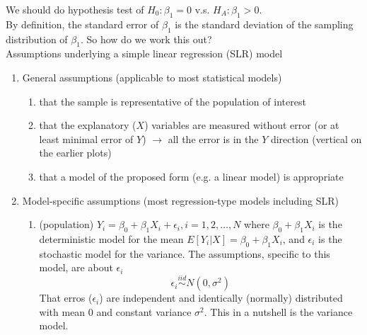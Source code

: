 \documentclass[a4paper, 11pt, twoside]{article}
\begin{document}
We should do hypothesis test of $H_0: \beta_1=0$ v.s. $H_A:\beta_1 > 0$. \\

By definition, the standard error of $\beta_1$ is the standard deviation of the sampling distribution of $\beta_1$. So how do we work this out? \\

Assumptions underlying a simple linear regression (SLR) model

\begin{enumerate}
	\item  General assumptions (applicable to most statistical models)
	\begin{enumerate}
		\item that the sample is representative of the population of interest
		\item that the explanatory ($X$) variables are measured without error (or at least minimal error of $Y$) $\rightarrow$ all the error is in the $Y$ direction (vertical on the earlier plots)
		\item that a model of the proposed form (e.g. a linear model) is appropriate
	\end{enumerate}
	\item Model-specific assumptions (most regression-type models including SLR)
	\begin{enumerate}
		\item (population) $Y_i = \beta_0 + \beta_1X_i + \epsilon_i, i=1, 2, \dots, N$ where $\beta_0 + \beta_1X_i$ is the deterministic model for the mean $E[Y_i|X]=\beta_0+\beta_1X_i$, and $\epsilon_i$ is the stochastic model for the variance. The assumptions, specific to this model, are about $\epsilon_i$
		\[\epsilon_i \overset{iid}{\sim} N(0, \sigma^2)\]
		That erros ($\epsilon_i$) are independent and identically (normally) distributed with mean $0$ and constant variance $\sigma^2$. This in a nutshell is the variance model.  
	\end{enumerate}
\end{enumerate}
\end{document}
